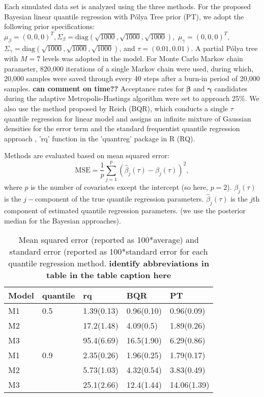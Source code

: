 \documentclass[12pt]{article}
\newcommand{\polya}{P\'{o}lya}
\begin{document}
Each simulated data set is analyzed using the three methods. For the proposed
Bayesian linear quantile regression with \polya{} Tree prior (PT),
we adopt the following prior specifications: $\mu_{\beta} = (0,0,0)^T, 
\Sigma_{\beta}=\text{diag} (\sqrt{1000},\sqrt{1000},\sqrt{1000}), $
$\mu_{\gamma} = (0,0,0)^T$, 
$\Sigma_{\gamma}=\text{diag} (\sqrt{1000},\sqrt{1000},\sqrt{1000}) $,
and $\tau=(0.01, 0.01)$. A partial \polya{} tree with $M=7$ levels was adopted
in the model. For Monte Carlo Markov chain parameter, 820,000
iterations of a single Markov chain were used, during which, 20,000
samples were saved through every 40 steps after a burn-in period of
20,000 samples. {\bf can comment on time??}  Acceptance rates for $\bm{\beta}$ and $\bm{\gamma}$ candidates
during the adaptive Metropolis-Hastings algorithm were set to approach
25\%.  
We also use the method proposed by Reich (BQR),
which conducts a single $\tau$
quantile regression for linear model and assigns an infinite mixture
of Gaussian densities for the error term and the
standard frequentist quantile regression approach , 'rq' function in
the 'quantreg' package in R (RQ). 

Methods are evaluated  based on mean squared error: 
\begin{displaymath}
  \text{MSE}  = \frac{1}{p} \sum_{j=1}^p (\hat{\beta}_j(\tau) -
  \beta_j(\tau))^2, 
\end{displaymath}
where $p$ is the number of covariates except the intercept (so here,
$p=2$). $\beta_j(\tau)$ is the 
$j-$component of the true quantile regression
parameters. $\hat{\beta}_j(\tau)$ is the  $j$th component of estimated
quantile regression parameters. (we use the posterior median for
the Bayesian approaches).

\begin{center}
  \begin{table}[h]
    \centering
    \caption[]{ Mean squared error (reported as 100*average) and standard
      error (reported as 100*standard error for each
      quantile regression method.  {\bf identify abbreviations in
        table in the table caption here}}
    \vspace{4mm}
    \begin{tabular}[tb]{l|l|lll}
      \hline
      Model & quantile & rq         & BQR        & PT          \\
      \hline
      M1    & 0.5      & 1.39(0.13) & 0.96(0.10) & 0.96(0.09)  \\
      M2    &          & 17.2(1.48) & 4.09(0.5)  & 1.89(0.26)  \\
      M3    &          & 95.4(6.69) & 16.5(1.90) & 6.29(0.86)  \\
      \hline
      M1    & 0.9      & 2.35(0.26) & 1.96(0.25) & 1.79(0.17)  \\
      M2    &          & 5.73(1.03) & 4.32(0.54) & 3.83(0.49)  \\
      M3    &          & 25.1(2.66) & 12.4(1.44) & 14.06(1.39) \\
      \hline
    \end{tabular}
    \label{tab:1}
  \end{table}
\end{center}
\end{document}
